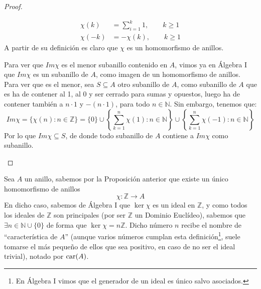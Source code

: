 \begin{prop}
\begin{proof}
\begin{description}
\begin{align*}
                    \chi(k) &= \sum\limits_{i=1}^{k} 1, \qquad k\geq 1 \\
                    \chi(-k) &= -\chi(k), \qquad k\geq 1
                \end{align*}
                A partir de su definición es claro que $\chi$ es un homomorfismo de anillos.
            \item [Minimalidad.] Para ver que $Im\chi$ es el menor subanillo contenido en $A$, vimos ya en Álgebra I que $Im\chi$ es un subanillo de $A$, como imagen de un homomorfismo de anillos. Para ver que es el menor, sea $S\subseteq A$ otro subanillo de $A$, como subanillo de $A$ que es ha de contener al 1, al 0 y ser cerrado para sumas y opuestos, luego ha de contener también a $n\cdot 1$ y $-(n\cdot 1)$, para todo $n\in \mathbb{N}$. Sin embargo, tenemos que:
                \begin{equation*}
                    Im\chi = \{\chi(n) : n\in \mathbb{Z}\} = \{0\}\cup \left\{\sum\limits_{k=1}^{n}\chi(1) : n\in \mathbb{N}\right\} \cup \left\{\sum\limits_{k=1}^{n}\chi(-1) : n\in \mathbb{N}\right\}
                \end{equation*}
                 Por lo que $Im\chi \subseteq S$, de donde todo subanillo de $A$ contiene a $Im \chi$ como subanillo.
        \end{description}
    \end{proof}
\end{prop}

\begin{definicion}
    Sea $A$ un anillo, sabemos por la Proposición anterior que existe un único homomorfismo de anillos 
    \begin{equation*}
        \chi:\mathbb{Z}\to A
    \end{equation*}
    En dicho caso, sabemos de Álgebra I que $\ker\chi$ es un ideal en $\mathbb{Z}$, y como todos los ideales de $\mathbb{Z}$ son principales (por ser $\mathbb{Z}$ un Dominio Euclídeo), sabemos que $\exists n\in \mathbb{N}\cup \{0\}$ de forma que $\ker\chi = n\mathbb{Z}$. Dicho número $n$ recibe el nombre de ``característica de $A$'' (aunque varios números cumplan esta definición\footnote{En Álgebra I vimos que el generador de un ideal es único salvo asociados.}, suele tomarse el más pequeño de ellos que sea positivo, en caso de no ser el ideal trivial), notado por $\operatorname{car}(A)$.
\end{definicion}

